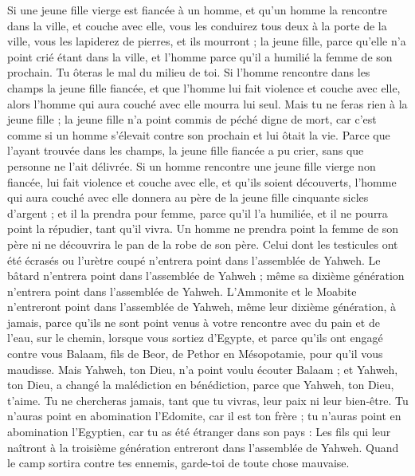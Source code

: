 \begin{multicols}{2}
Si une jeune fille vierge est fiancée à un homme, et qu’un homme la rencontre dans la ville, et couche avec elle,
vous les conduirez tous deux à la porte de la ville, vous les lapiderez de pierres, et ils mourront ; la jeune fille, parce qu'elle n’a point crié étant dans la ville, et l'homme parce qu'il a humilié la femme de son prochain. Tu ôteras le mal du milieu de toi.
Si l’homme rencontre dans les champs la jeune fille fiancée, et que l’homme lui fait violence et couche avec elle, alors l'homme qui aura couché avec elle mourra lui seul.
Mais tu ne feras rien à la jeune fille ; la jeune fille n'a point commis de péché digne de mort, car c’est comme si un homme s'élevait contre son prochain et lui ôtait la vie.
Parce que l'ayant trouvée dans les champs, la jeune fille fiancée a pu crier, sans que personne ne l’ait délivrée.
Si un homme rencontre une jeune fille vierge non fiancée, lui fait violence et couche avec elle, et qu'ils soient découverts,
l'homme qui aura couché avec elle donnera au père de la jeune fille cinquante sicles d'argent ; et il la prendra pour femme, parce qu'il l'a humiliée, et il ne pourra point la répudier, tant qu'il vivra.
Un homme ne prendra point la femme de son père ni ne découvrira le pan de la robe de son père.
\VerseOne{}Celui dont les testicules ont été écrasés ou l'urètre coupé n'entrera point dans l'assemblée de Yahweh.
Le bâtard n'entrera point dans l'assemblée de Yahweh ; même sa dixième génération n'entrera point dans l'assemblée de Yahweh.
L’Ammonite et le Moabite n'entreront point dans l'assemblée de Yahweh, même leur dixième génération, à jamais,
parce qu'ils ne sont point venus à votre rencontre avec du pain et de l'eau, sur le chemin, lorsque vous sortiez d'Egypte, et parce qu'ils ont engagé contre vous Balaam, fils de Beor, de Pethor en Mésopotamie, pour qu’il vous maudisse.
Mais Yahweh, ton Dieu, n’a point voulu écouter Balaam ; et Yahweh, ton Dieu, a changé la malédiction en bénédiction, parce que Yahweh, ton Dieu, t'aime.
Tu ne chercheras jamais, tant que tu vivras, leur paix ni leur bien-être.
Tu n'auras point en abomination l'Edomite, car il est ton frère ; tu n'auras point en abomination l'Egyptien, car tu as été étranger dans son pays :
Les fils qui leur naîtront à la troisième génération entreront dans l'assemblée de Yahweh.
Quand le camp sortira contre tes ennemis, garde-toi de toute chose mauvaise.

\end{multicols}
